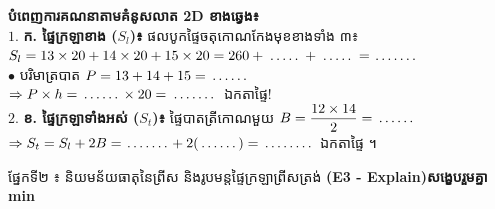 \documentclass[a4paper,10pt]{article}
\newcommand{\en}[1]{{\TimesEn #1}}
\newcommand{\enbf}[1]{{\TimesEn\textbf{#1}}}
\newcommand{\blank}[1]{\makebox[#1]{\dotfill}}
\newcommand{\secbar}[2]{%
  \vspace{3pt}%
  \begin{tcolorbox}[
    enhanced, sharp corners, colback=headgray, colframe=black,
    boxrule=0.9pt, boxsep=1pt, top=2.5pt, bottom=2.5pt, left=6pt, right=6pt,
    after skip=3pt
  ]
    {\muol\fontsize{9.2pt}{13.5pt}\selectfont #1}\hfill{\fontsize{8.3pt}{11.5pt}\selectfont\textbf{#2}}
  \end{tcolorbox}%
}
\begin{document}
\hfill
\begin{minipage}[c]{9.4cm}
  \textbf{បំពេញការគណនាតាមគំនូសលាត \en{2D} ខាងឆ្វេង៖}\\[6.5pt]
  $1.$ \textbf{ក. ផ្ទៃក្រឡាខាង ($S_l$)៖} ផលបូកផ្ទៃចតុកោណកែងមុខខាងទាំង ៣៖\\[2.5pt]
  \hspace*{0.25cm}$S_l = 13\times 20 + 14\times 20 + 15\times 20 = 260 + \blank{0.9cm} + \blank{0.9cm} = \blank{1.1cm}$\\[3.5pt]
  \hspace*{0.25cm}$\bullet$ បរិមាត្របាត $P = 13 + 14 + 15 = \blank{1.0cm}$\\[3.5pt]
  \hspace*{0.25cm}$\Rightarrow P \times h = \blank{1.0cm} \times 20 = \blank{1.2cm}$ ឯកតាផ្ទៃ!\\[6.5pt]
  $2.$ \textbf{ខ. ផ្ទៃក្រឡាទាំងអស់ ($S_t$)៖} ផ្ទៃបាតត្រីកោណមួយ $B = \dfrac{12\times 14}{2} = \blank{1.0cm}$\\[3.5pt]
  \hspace*{0.25cm}$\Rightarrow S_t = S_l + 2B = \blank{1.1cm} + 2(\blank{1.0cm}) = \blank{1.3cm}$ ឯកតាផ្ទៃ ។
\end{minipage}

\vspace{16pt}
\secbar{ផ្នែកទី២ ៖ និយមន័យធាតុនៃព្រីស និងរូបមន្តផ្ទៃក្រឡាព្រីសត្រង់ \enbf{(E3 - Explain)}}{សង្ខេបរួមគ្នា \en{6 min}}
\end{document}
